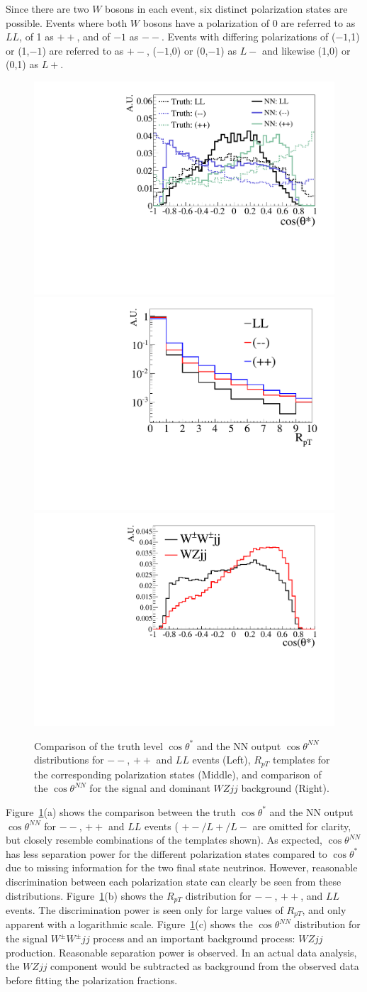 \documentclass[aps,prl,twocolumn,showpacs,superscriptaddress,groupeaddress,floatfix]{revtex4}
\def\ssWW{\ensuremath{ W^{\pm}W^{\pm}jj }\xspace}
\def\ts{\ensuremath{ \theta^{*} }\xspace}
\def\tsNN{\ensuremath{ \theta^{NN} }\xspace}
\def\cts{\ensuremath{ \cos\ts }\xspace}
\def\ctsNN{\ensuremath{ \cos\tsNN }\xspace}
\begin{document}
Since there are two $W$ bosons in each event, six distinct polarization states are possible. Events where both $W$ bosons have a polarization of 0 are referred to as $LL$, of 1 as $++$, and of $-1$ as $--$. Events with differing polarizations of ($-1$,1) or (1,$-1$) are referred to as $+-$, ($-1$,0) or (0,$-1$) as $L-$ and likewise (1,0) or (0,1) as $L+$. 

\begin{figure}
\includegraphics[width=.32\textwidth,height=.18\textheight]{fig_01a.pdf}
\includegraphics[width=.32\textwidth,height=.18\textheight]{fig_01b.pdf}
\includegraphics[width=.32\textwidth,height=.18\textheight]{fig_01c.pdf}
\caption{\label{fig:polarization_comparison} Comparison of the truth level \cts and the 
NN output \ctsNN distributions for $--$, $++$ and $LL$ events (Left), 
$R_{pT}$ templates for the corresponding polarization states (Middle), 
and comparison of the \ctsNN for the signal and dominant $WZjj$ background (Right).}
\end{figure}

Figure~\ref{fig:polarization_comparison}(a) shows the comparison between the truth \cts and 
the NN output \ctsNN for $--$, $++$ and $LL$ events ( $+-/L+/L-$ are omitted for clarity, but closely resemble combinations of the templates shown). As expected, \ctsNN has less separation 
power for the different polarization states compared to \cts due to missing information for the two final state neutrinos. 
However, reasonable discrimination between each polarization state can clearly be seen from these distributions. 
Figure~\ref{fig:polarization_comparison}(b) shows the $R_{pT}$ distribution for $--$, $++$, and $LL$ events. 
The discrimination power is seen only for large values of $R_{pT}$, and only apparent with a logarithmic scale. Figure~\ref{fig:polarization_comparison}(c) shows the \ctsNN distribution for the signal \ssWW process and an important background process: $WZjj$ production.  Reasonable separation power is observed. In an actual data analysis, the $WZjj$ component would be subtracted as background
from the observed data before fitting the polarization fractions.
\end{document}
